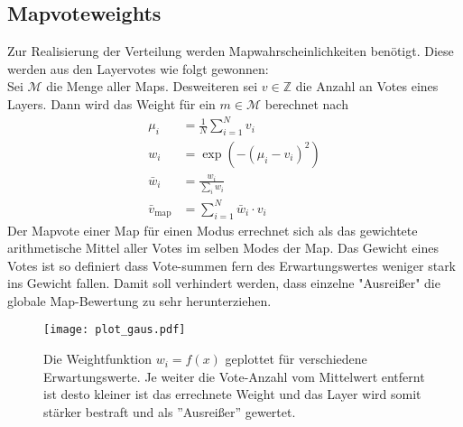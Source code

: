     \subsection{Mapvoteweights}
        Zur Realisierung der Verteilung werden Mapwahrscheinlichkeiten benötigt. 
        Diese werden aus den Layervotes wie folgt gewonnen:\\
        Sei $\mathcal{M}$ die Menge aller Maps. 
        Desweiteren sei $v\in\mathbb{Z}$ die Anzahl an Votes eines Layers.
        Dann wird das Weight für ein $m\in \mathcal{M}$ berechnet nach 
        \begin{align*}
            \mu_i &= \frac{1}{N}\sum_{i=1}^N v_i\\
            w_i &= \exp\left(-(\mu_i-v_i)^2\right)\\
            \bar{w}_i &= \frac{w_i}{\sum_i w_i}\\
            \bar{v}_\text{map} &= \sum_{i=1}^N\bar{w}_i\cdot v_i
        \end{align*}
        Der Mapvote einer Map für einen Modus errechnet sich als das gewichtete arithmetische Mittel aller Votes im selben Modes der Map.
        Das Gewicht eines Votes ist so definiert dass Vote-summen fern des Erwartungswertes weniger stark ins Gewicht fallen.
        Damit soll verhindert werden, dass einzelne "Ausreißer" die globale Map-Bewertung zu sehr herunterziehen.
        \begin{figure}[htbp]
            \centering
            \texttt{[image: plot\_gaus.pdf]}
            \caption{Die Weightfunktion $w_i=f(x)$ geplottet für verschiedene Erwartungswerte.
            Je weiter die Vote-Anzahl vom Mittelwert entfernt ist desto kleiner ist das errechnete Weight und das Layer wird somit stärker bestraft und als ''Ausreißer'' gewertet.}
        \end{figure}
